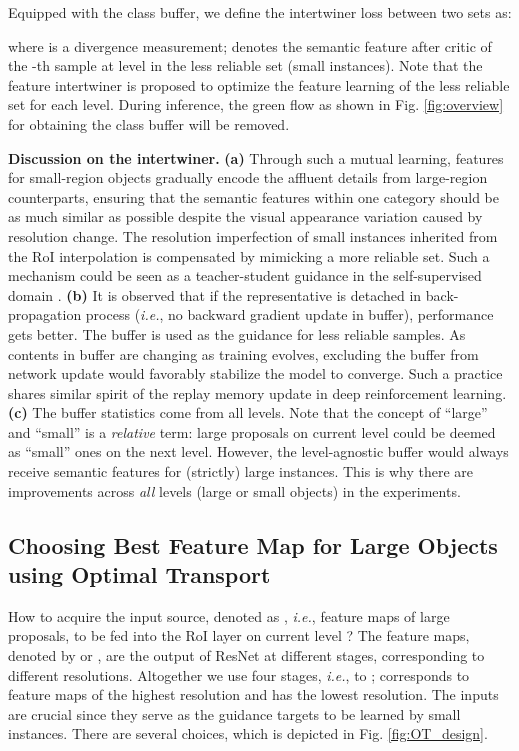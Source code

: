 \documentclass{article} \usepackage{iclr2019_conference,times}
\begin{document}
Equipped with the class buffer, we define the intertwiner loss between two sets as:

where  is a divergence measurement;
 denotes the semantic feature after critic of the -th sample at level  in the less reliable set (small instances).
Note that the feature intertwiner is proposed to
optimize the feature learning of the less reliable set for each level. During inference, the green flow as shown in Fig. \ref{fig:overview} for obtaining the class buffer will be removed.



\textbf{Discussion on the intertwiner.} \textbf{(a)} Through such a mutual learning, features for small-region objects gradually encode the affluent details from large-region counterparts, ensuring that the semantic features within one category should be as much similar as possible despite the visual appearance variation caused by resolution change. 
The resolution imperfection of small instances inherited from the RoI interpolation is compensated by mimicking a more reliable set. 
Such a mechanism could be seen as a teacher-student guidance in the self-supervised domain \citep{chen2017_obj_det_data_dis}.
\textbf{(b)} 
It is observed that if the representative  is detached in back-propagation process {(\textit{i.e.}, no backward gradient update in buffer)},  performance gets better. The buffer is used as the guidance for less reliable samples.
As contents in buffer are changing as training evolves, excluding the buffer from network update would favorably stabilize the model to converge. 
Such a practice shares similar spirit of the replay memory update in deep reinforcement learning.
\textbf{(c)} The buffer statistics come from all levels. Note that the concept of ``large'' and ``small'' is a \textit{relative} term: large proposals on current level could be deemed as ``small'' ones on the next level. However, the level-agnostic buffer would always receive semantic features for (strictly) large instances. 
This is why there are improvements across \textit{all} levels (large or small objects) in the experiments.


\subsection{Choosing Best Feature Map for Large Objects using Optimal Transport }\label{sec:optimal-transport-divergence-as-information-alignment}

How to acquire the input source, 
denoted as , \textit{i.e.}, feature maps of large proposals, to be fed into the RoI layer on current level ? 
The feature maps, denoted by  or , are the output of ResNet at different stages, corresponding to different resolutions. Altogether we use four stages, \textit{i.e.},  to ;  corresponds to feature maps of the highest resolution and  has the lowest resolution.
The inputs are crucial since they serve as the guidance targets to be learned by small instances. 
There are several choices, which is depicted in Fig. \ref{fig:OT_design}.
\end{document}
